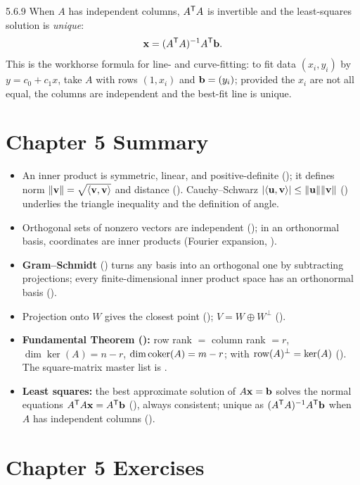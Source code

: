 \begin{rmks}{5.6.9}
When $A$ has independent columns, $A^{\mathsf{T}} A$ is invertible and the least-squares solution is \emph{unique}:
\[
\mathbf{x}=(A^{\mathsf{T}} A)^{-1} A^{\mathsf{T}}\mathbf{b}.
\]
This is the workhorse formula for line- and curve-fitting: to fit data $(x_i,y_i)$ by $y=c_0+c_1x$, take $A$ with rows $(1,x_i)$ and $\mathbf{b}=(y_i)$; provided the $x_i$ are not all equal, the columns are independent and the best-fit line is unique.
\end{rmks}

\section*{Chapter 5 Summary}
\begin{itemize}[leftmargin=1.4em,itemsep=2pt]
\item An inner product is symmetric, linear, and positive-definite (); it defines norm $\lVert \mathbf{v} \rVert=\sqrt{\langle \mathbf{v}, \mathbf{v} \rangle}$ and distance (). Cauchy--Schwarz $\lvert \langle \mathbf{u}, \mathbf{v} \rangle \rvert\le\lVert \mathbf{u} \rVert\lVert \mathbf{v} \rVert$ () underlies the triangle inequality and the definition of angle.
\item Orthogonal sets of nonzero vectors are independent (); in an orthonormal basis, coordinates are inner products (Fourier expansion, ).
\item \textbf{Gram--Schmidt} () turns any basis into an orthogonal one by subtracting projections; every finite-dimensional inner product space has an orthonormal basis ().
\item Projection onto $W$ gives the closest point (); $V=W\oplus W^\perp$ ().
\item \textbf{Fundamental Theorem ():} row rank $=$ column rank $=r$, $\dim\ker(A)=n-r$, $\operatorname{dim}\operatorname{coker}(A)=m-r$; with $\operatorname{row}(A)^\perp=\ker(A)$ (). The square-matrix master list is .
\item \textbf{Least squares:} the best approximate solution of $A\mathbf{x}=\mathbf{b}$ solves the normal equations $A^{\mathsf{T}} A\mathbf{x}=A^{\mathsf{T}}\mathbf{b}$ (), always consistent; unique as $(A^{\mathsf{T}} A)^{-1} A^{\mathsf{T}}\mathbf{b}$ when $A$ has independent columns ().
\end{itemize}

\section*{Chapter 5 Exercises}

